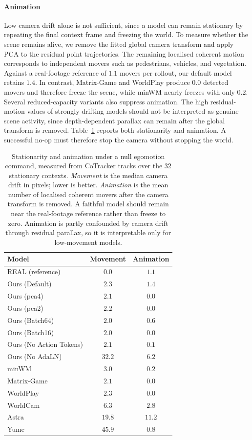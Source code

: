 \documentclass[letterpaper]{article} %
\begin{document}
\paragraph{Animation}
Low camera drift alone is not sufficient, since a model can remain stationary
by repeating the final context frame and freezing the world. To measure whether
the scene remains alive, we remove the fitted global camera transform and apply
PCA to the residual point trajectories. The remaining localised coherent motion
corresponds to independent movers such as pedestrians, vehicles, and
vegetation. Against a real-footage reference of $1.1$ movers per rollout, our
default model retains $1.4$. In contrast, Matrix-Game and WorldPlay produce
$0.0$ detected movers and therefore freeze the scene, while minWM nearly
freezes with only $0.2$. Several reduced-capacity variants also suppress
animation. The high residual-motion values of strongly drifting models should
not be interpreted as genuine scene activity, since depth-dependent parallax
can remain after the global transform is removed. Table~\ref{tab:anim} reports
both stationarity and animation. A successful no-op must therefore stop the
camera without stopping the world.
\begin{table}[t]
\centering
{
\small
\begin{tabular}{lcc}
\toprule
Model & Movement & Animation \\
\midrule
REAL (reference)        & $0.0$  & $1.1$  \\
\midrule
Ours (Default)          & $2.3$  & $1.4$  \\
Ours (pca4)             & $2.1$  & $0.0$  \\
Ours (pca2)             & $2.2$  & $0.0$  \\
Ours (Batch64)          & $2.0$  & $0.6$  \\
Ours (Batch16)          & $2.0$  & $0.0$  \\
Ours (No Action Tokens) & $2.1$  & $0.1$  \\
Ours (No AdaLN)         & $32.2$ & $6.2$  \\
\midrule
minWM                   & $3.0$  & $0.2$  \\
Matrix-Game             & $2.1$  & $0.0$  \\
WorldPlay               & $2.3$  & $0.0$  \\
WorldCam                & $6.3$  & $2.8$  \\
Astra                   & $19.8$ & $11.2$ \\
Yume                    & $45.9$ & $0.8$  \\
\bottomrule
\end{tabular}
}
\caption{
    Stationarity and animation under a null egomotion command, measured from
    CoTracker tracks over the $32$ stationary contexts. \emph{Movement} is the
    median camera drift in pixels; lower is better. \emph{Animation} is the mean
    number of localised coherent movers after the camera transform is removed.
    A faithful model should remain near the real-footage reference rather than
    freeze to zero. Animation is partly confounded by camera drift through
    residual parallax, so it is interpretable only for low-movement models.
}
\label{tab:anim}
\end{table}
\end{document}

